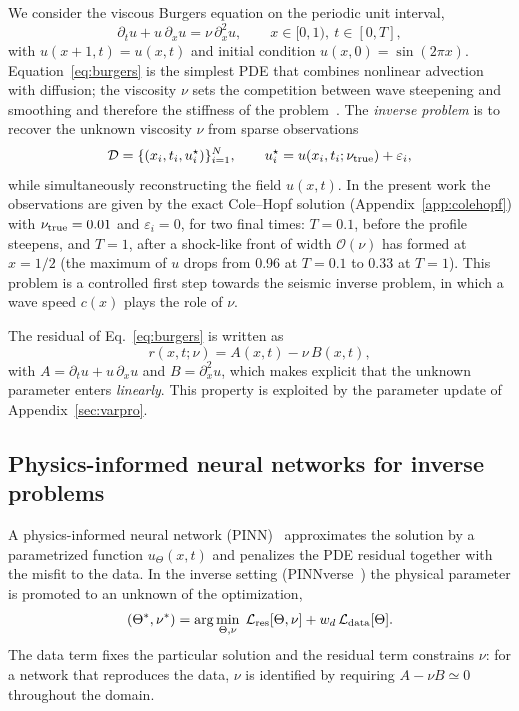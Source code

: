 \documentclass[floatfix,aps,pra,twocolumn,showpacs,superscriptaddress,10pt,nofootinbib]{revtex4-2}
\begin{document}
We consider the viscous Burgers equation on the periodic unit interval,
\begin{equation}
  \partial_t u + u\,\partial_x u = \nu\,\partial_x^2 u,\qquad x\in[0,1),\ t\in[0,T],
  \label{eq:burgers}
\end{equation}
with $u(x+1,t)=u(x,t)$ and initial condition $u(x,0)=\sin(2\pi x)$. Equation~\eqref{eq:burgers} is the simplest PDE that combines nonlinear advection with diffusion; the viscosity $\nu$ sets the competition between wave steepening and smoothing and therefore the stiffness of the problem~\cite{basdevant1986spectral}. The \emph{inverse problem} is to recover the unknown viscosity $\nu$ from sparse observations
\begin{equation}
  \mathcal D=\{(x_i,t_i,u^\star_i)\}_{i=1}^{N},\qquad u^\star_i=u(x_i,t_i;\nu_{\rm true})+\varepsilon_i ,
  \label{eq:data}
\end{equation}
while simultaneously reconstructing the field $u(x,t)$. In the present work the observations are given by the exact Cole--Hopf solution (Appendix~\ref{app:colehopf}) with $\nu_{\rm true}=0.01$ and $\varepsilon_i=0$, for two final times: $T=0.1$, before the profile steepens, and $T=1$, after a shock-like front of width $\mathcal O(\nu)$ has formed at $x=1/2$ (the maximum of $u$ drops from 0.96 at $T=0.1$ to 0.33 at $T=1$). This problem is a controlled first step towards the seismic inverse problem, in which a wave speed $c(x)$ plays the role of $\nu$.

The residual of Eq.~\eqref{eq:burgers} is written as
\begin{equation}
  r(x,t;\nu)=A(x,t)-\nu\,B(x,t),
  \label{eq:residual}
\end{equation}
with $A=\partial_t u+u\,\partial_x u$ and $B=\partial_x^2 u$, which makes explicit that the unknown parameter enters \emph{linearly}. This property is exploited by the parameter update of Appendix~\ref{sec:varpro}.

\subsection{Physics-informed neural networks for inverse problems}\label{sec:pinn}

A physics-informed neural network (PINN)~\cite{raissi2019physics,karniadakis2021physics} approximates the solution by a parametrized function $u_\Theta(x,t)$ and penalizes the PDE residual together with the misfit to the data. In the inverse setting (PINNverse~\cite{PhysRevA.110.032607}) the physical parameter is promoted to an unknown of the optimization,
\begin{equation}
  (\Theta^\ast,\nu^\ast)=\arg\min_{\Theta,\nu}\; \mathcal L_{\rm res}[\Theta,\nu]+w_d\,\mathcal L_{\rm data}[\Theta].
  \label{eq:pinn_inverse}
\end{equation}
The data term fixes the particular solution and the residual term constrains $\nu$: for a network that reproduces the data, $\nu$ is identified by requiring $A-\nu B\simeq0$ throughout the domain.
\end{document}
